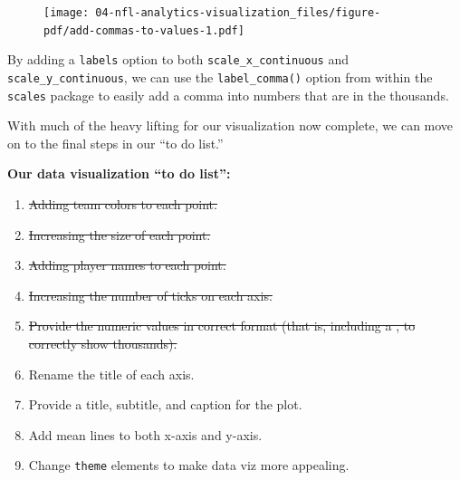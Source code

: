 \documentclass[
  letterpaper,
]{krantz}
\begin{document}
\begin{figure}[H]

{\centering \texttt{[image: 04-nfl-analytics-visualization\_files/figure-pdf/add-commas-to-values-1.pdf]}

}

\end{figure}

By adding a \texttt{labels} option to both \texttt{scale\_x\_continuous}
and \texttt{scale\_y\_continuous}, we can use the
\texttt{label\_comma()} option from within the \texttt{scales} package
to easily add a comma into numbers that are in the thousands.

With much of the heavy lifting for our visualization now complete, we
can move on to the final steps in our ``to do list.''

\begin{tcolorbox}[enhanced jigsaw, left=2mm, toprule=.15mm, opacitybacktitle=0.6, leftrule=.75mm, bottomrule=.15mm, colbacktitle=quarto-callout-note-color!10!white, breakable, colback=white, bottomtitle=1mm, toptitle=1mm, title=\textcolor{quarto-callout-note-color}{\faInfo}\hspace{0.5em}{Note}, coltitle=black, titlerule=0mm, arc=.35mm, opacityback=0, colframe=quarto-callout-note-color-frame, rightrule=.15mm]

\textbf{Our data visualization ``to do list'':}

\begin{enumerate}
\def\labelenumi{\arabic{enumi}.}
\item
  \st{Adding team colors to each point.}
\item
  \st{Increasing the size of each point.}
\item
  \st{Adding player names to each point.}
\item
  \st{Increasing the number of ticks on each axis.}
\item
  \st{Provide the numeric values in correct format (that is, including a
  , to correctly show thousands).}
\item
  Rename the title of each axis.
\item
  Provide a title, subtitle, and caption for the plot.
\item
  Add mean lines to both x-axis and y-axis.
\item
  Change \texttt{theme} elements to make data viz more appealing.
\end{enumerate}

\end{tcolorbox}
\end{document}
